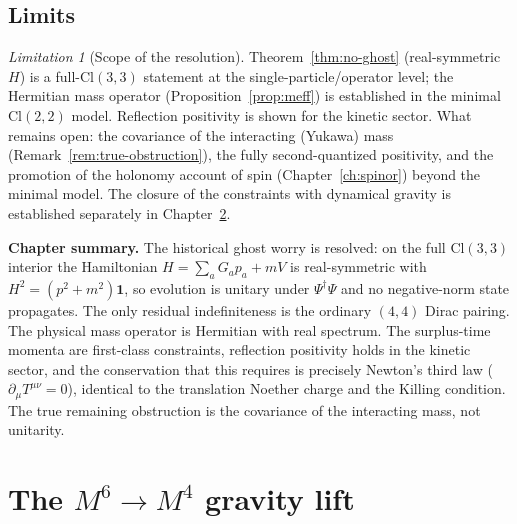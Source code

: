 \documentclass[11pt,oneside]{book}
\newcommand{\Cl}{\mathrm{Cl}}                     %
\theoremstyle{plain}
\theoremstyle{definition}
\theoremstyle{remark}
\newtheorem{limitation}[theorem]{Limitation}
\begin{document}
\section{Limits}
\label{sec:ghost-limits}

\begin{limitation}[Scope of the resolution]
\label{lim:ghost}
Theorem~\ref{thm:no-ghost} (real-symmetric $H$) is a full-$\Cl(3,3)$ statement at
the single-particle/operator level; the Hermitian mass operator
(Proposition~\ref{prop:meff}) is established in the minimal $\Cl(2,2)$ model.
Reflection positivity is shown for the kinetic sector. What remains open: the
covariance of the interacting (Yukawa) mass (Remark~\ref{rem:true-obstruction}),
the fully second-quantized positivity, and the promotion of the holonomy account of
spin (Chapter~\ref{ch:spinor}) beyond the minimal model. The closure of the
constraints with dynamical gravity is established separately in
Chapter~\ref{ch:lift}.
\end{limitation}

\begin{leavesbox}
\textbf{Chapter summary.} The historical ghost worry is resolved: on the full
$\Cl(3,3)$ interior the Hamiltonian $H=\sum_a G_a p_a+mV$ is real-symmetric with
$H^2=(p^2+m^2)\mathbf 1$, so evolution is unitary under $\Psi^\dagger\Psi$ and no
negative-norm state propagates. The only residual indefiniteness is the ordinary
$(4,4)$ Dirac pairing. The physical mass operator is Hermitian with real spectrum.
The surplus-time momenta are first-class constraints, reflection positivity holds in
the kinetic sector, and the conservation that this requires is precisely Newton's
third law ($\partial_\mu T^{\mu\nu}=0$), identical to the translation Noether charge
and the Killing condition. The true remaining obstruction is the covariance of the
interacting mass, not unitarity.
\end{leavesbox}

\chapter{The $M^6\to M^4$ gravity lift}
\label{ch:lift}
\end{document}
